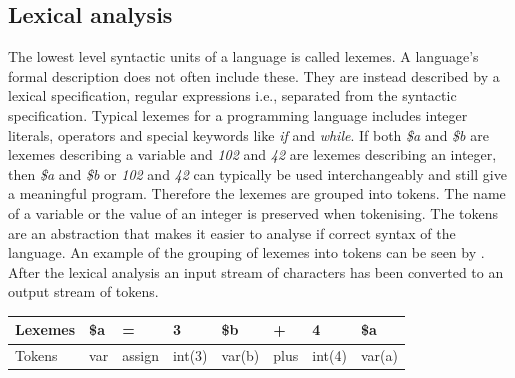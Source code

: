 \subsection{Lexical analysis}
The lowest level syntactic units of a language is called lexemes. A language's formal description does not often include these. They are instead described by a lexical specification, regular expressions i.e., separated from the syntactic specification\cite[p. 135]{sebesta2013}. Typical lexemes for a programming language includes integer literals, operators and special keywords like \textit{if} and \textit{while}. If both \textit{\$a} and \textit{\$b} are lexemes describing a variable and \textit{102} and \textit{42} are lexemes describing an integer, then \textit{\$a} and \textit{\$b} or \textit{102} and \textit{42} can typically be used interchangeably and still give a meaningful program. Therefore the lexemes are grouped into tokens. The name of a variable or the value of an integer is preserved when tokenising. The tokens are an abstraction that makes it easier to analyse if correct syntax of the language. An example of the grouping of lexemes into tokens can be seen by . After the lexical analysis an input stream of characters has been converted to an output stream of tokens.

\begin{centering}
\centering
\begin{table}
    \begin{tabular}{|l|l|l|l|l|l|l|l|}
        \hline
        Lexemes & \$a  & =      & 3   & \$b  & +    & 4   & \$a  \\ \hline
        Tokens & var & assign & int(3) & var(b) & plus & int(4) & var(a)  \\
        \hline
    \end{tabular}
    \label{table:lexandtokens}
\end{table}
\end{centering}

